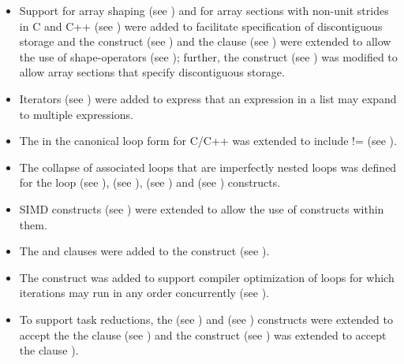\begin{itemize}
\item Support for array shaping (see ) and 
      for array sections with non-unit strides  in C and C++ (see 
      ) were added to facilitate specification 
      of discontiguous storage and the  construct (see 
      ) and the  clause 
      (see ) were extended to allow the use 
      of shape-operators (see ); further, the 
       construct (see ) was modified to allow array sections that specify 
      discontiguous storage.

\item Iterators (see ) were added to express that an
      expression in a list may expand to multiple expressions.

\item The  in the canonical loop form for C/C++ was
      extended to include != (see ).

\item The collapse of associated loops that are imperfectly nested loops
      was defined for the loop (see ),
       (see ), 
      (see ) and  (see
      ) constructs.

\item SIMD constructs (see ) were extended
      to allow the use of  constructs within them.

\item The  and  clauses were added to the 
       construct (see ).

\item The  construct was added to support compiler
      optimization of loops for which iterations may run in any order
      concurrently (see ).

\item To support task reductions, the  (see
      ) and  (see
      ) constructs were extended to
      accept the the  clause (see
      ) and the 
      construct (see ) was extended
      to accept the  clause
      ).


\end{itemize}
